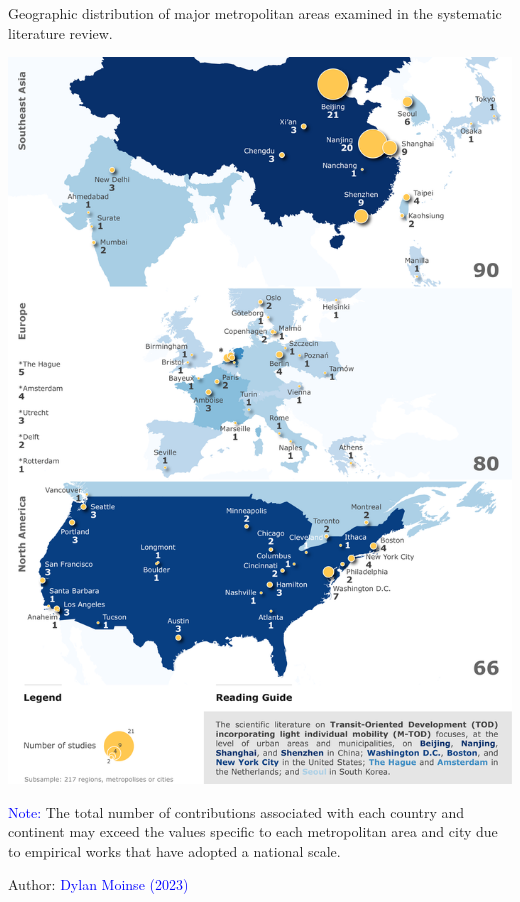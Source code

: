 \begin{refsegment}
    \begin{carte}[h!]\vspace*{4pt}
        \caption{Geographic distribution of major metropolitan areas examined in the systematic literature review.}
        \label{fig-chap2:terrains-geographiques-villes}
        \centerline{\includegraphics[width=1\columnwidth]{src/Figures/Chap-2/EN_RSL_Carte_Villes.pdf}}
        \vspace{5pt}
        \begin{flushleft}\scriptsize{
        \textcolor{blue}{Note:} The total number of contributions associated with each country and continent may exceed the values specific to each metropolitan area and city due to empirical works that have adopted a national scale.
        }\end{flushleft}
        \begin{flushright}\scriptsize{
        Author: \textcolor{blue}{Dylan Moinse (2023)}
        }\end{flushright}
    \end{carte}


\end{refsegment}
